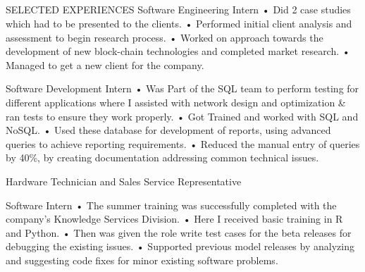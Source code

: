 \documentclass{my_cv}
\begin{document}
\begin{multicols}{2}
\vspace{-1.5cm}

\section{\faPencil}{SELECTED EXPERIENCES}
\vspace{-0.2cm}
    {Software Engineering Intern}%
    {
        • Did 2 case studies which had to be presented to the clients. \newline
        • Performed initial client analysis and assessment to begin research process. \newline
        • Worked on approach towards the development of new block-chain technologies and completed market research. \newline
        • Managed to get a new client for the company.
}
    {}

    {Software Development Intern}
    { 
        • Was Part of the SQL team to perform testing for different applications where I assisted with network design and optimization & ran tests to ensure they work properly. \newline
        • Got Trained and worked with SQL and NoSQL. \newline
        • Used these database for development of reports, using advanced queries to achieve reporting requirements. \newline
        • Reduced the manual entry of queries by 40\%, by creating documentation addressing common technical issues.
}
    {}
    
%
    {Hardware Technician and Sales Service Representative}%
    {
}
    {}

\vspace{-0.6cm}
    
%
    {Software Intern}%
    {
        • The summer training was successfully completed with the company's Knowledge Services Division. \newline
        • Here I received basic training in R and Python. \newline
        • Then was given the role write test cases for the beta releases for debugging the existing issues. \newline
        • Supported previous model releases by analyzing and suggesting code fixes for minor existing software problems.
    }
    {}
    
\end{multicols}
\end{document}
